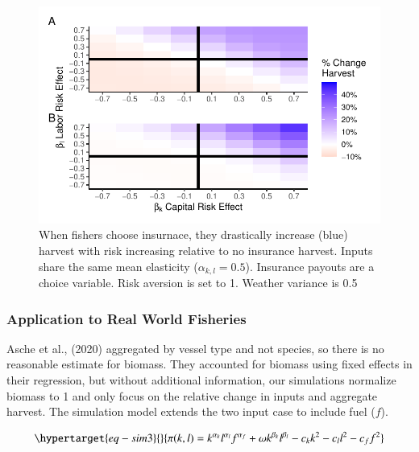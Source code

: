 \documentclass[
  super,
  preprint,
  3p]{elsarticle}
\theoremstyle{plain}
\theoremstyle{plain}
\theoremstyle{remark}
\begin{document}
\begin{figure}

{\centering \includegraphics{index-bc_files/figure-pdf/fig-multi-h-even-hi-1.pdf}

}

\caption{\label{fig-multi-h-even-hi}When fishers choose insurnace, they
drastically increase (blue) harvest with risk increasing relative to no
insurance harvest. Inputs share the same mean elasticity
(\(\alpha_{k,l}=0.5\)). Insurance payouts are a choice variable. Risk
aversion is set to 1. Weather variance is 0.5}

\end{figure}

\hypertarget{application-to-real-world-fisheries}{%
\subsubsection{Application to Real World
Fisheries}\label{application-to-real-world-fisheries}}

Asche et al., (2020) aggregated by vessel type and not species, so there
is no reasonable estimate for biomass. They accounted for biomass using
fixed effects in their regression, but without additional information,
our simulations normalize biomass to 1 and only focus on the relative
change in inputs and aggregate harvest. The simulation model extends the
two input case to include fuel (\(f\)).

\begin{equation}\protect\hypertarget{eq-sim3}{}{
\pi(k,l)=k^{\alpha_k}l^{\alpha_l}f^{\alpha_f}+\omega k^{\beta_k}l^{\beta_l}-c_kk^2-c_ll^2-c_ff^2
}\label{eq-sim3}\end{equation}
\end{document}
